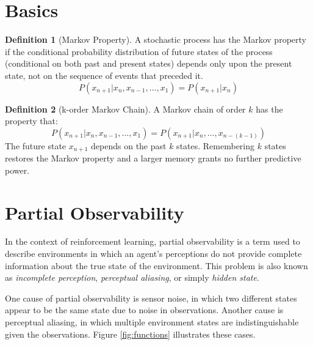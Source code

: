 \documentclass{article} %
\title{}
\author{}
\theoremstyle{definition}
\newtheorem{definition}{Definition}[section]
\begin{document}
\maketitle

\begin{abstract}

\end{abstract}

\section{Basics}

\begin{definition}[Markov Property]
A stochastic process has the Markov property if the conditional
probability distribution of future states of the process (conditional
on both past and present states) depends only upon the present state,
not on the sequence of events that preceded it.
\[
P(x_{n+1} | x_{n}, x_{n-1}, \dots, x_{1}) = P(x_{n+1} | x_{n})
\]
\end{definition}

\begin{definition}[k-order Markov Chain]
A Markov chain of order $k$ has the property that:
\[
P(x_{n+1} | x_{n}, x_{n-1}, \dots, x_{1}) = P(x_{n+1} | x_{n}, \dots, x_{n-(k-1)})
\]
The future state $x_{n+1}$ depends on the past $k$ states. Remembering
$k$ states restores the Markov property and a larger memory grants no
further predictive power.
\end{definition}

\section{Partial Observability}
In the context of reinforcement learning, partial observability is a
term used to describe environments in which an agent's perceptions do
not provide complete information about the true state of the
environment. This problem is also known as \textit{incomplete
  perception}, \textit{perceptual aliasing}, or simply \textit{hidden
  state}.

One cause of partial observability is sensor noise, in which two
different states appear to be the same state due to noise in
observations. Another cause is perceptual aliasing, in which multiple
environment states are indistinguishable given the
observations. Figure \ref{fig:functions} illustrates these cases.
\end{document}
